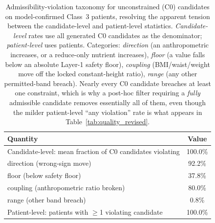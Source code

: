 \begin{table}[ht]
\centering
\caption{Admissibility-violation taxonomy for unconstrained (C0) candidates on
model-confirmed Class~3 patients, resolving the apparent tension between the
candidate-level and patient-level statistics. \emph{Candidate-level} rates use
all generated C0 candidates as the denominator; \emph{patient-level} uses
patients. Categories: \emph{direction} (an anthropometric increases, or a
reduce-only nutrient increases), \emph{floor} (a value falls below an absolute
Layer-1 safety floor), \emph{coupling} (BMI/waist/weight move off the locked
constant-height ratio), \emph{range} (any other permitted-band breach). Nearly
every C0 candidate breaches at least one constraint, which is why a post-hoc
filter requiring a \emph{fully} admissible candidate removes essentially all of
them, even though the milder patient-level ``any violation'' rate is what
appears in Table~\ref{tab:quality_revised}.}
\label{tab:violation_taxonomy}
\begin{tabular}{lc}
\toprule
Quantity & Value \\
\midrule
  Candidate-level: mean fraction of C0 candidates violating & 100.0\% \\
  \quad direction (wrong-sign move) & 92.2\% \\
  \quad floor (below safety floor) & 37.8\% \\
  \quad coupling (anthropometric ratio broken) & 80.0\% \\
  \quad range (other band breach) & 0.8\% \\
  Patient-level: patients with $\ge$1 violating candidate & 100.0\% \\
\bottomrule
\end{tabular}
\end{table}

